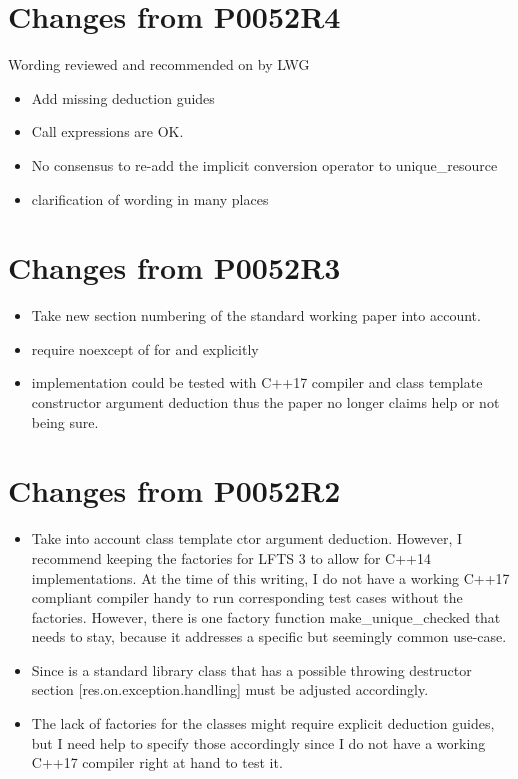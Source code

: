 \documentclass[ebook,11pt,article]{memoir}
\begin{document}
\section{Changes from P0052R4}
Wording reviewed and recommended on by LWG
\begin{itemize}
\item Add missing deduction guides
\item Call expressions are OK.
\item No consensus to re-add the implicit conversion operator to unique_resource
\item clarification of wording in many places
\end{itemize}

\section{Changes from P0052R3}
\begin{itemize}
\item Take new section numbering of the standard working paper into account.
\item require noexcept of  for  and  explicitly
\item implementation could be tested with C++17 compiler and class template constructor argument deduction thus the paper no longer claims help or not being sure.
\end{itemize}


\section{Changes from P0052R2}
\begin{itemize}
\item Take into account class template ctor argument deduction. However, I recommend keeping the factories for LFTS 3 to allow for C++14 implementations. At the time of this writing, I do not have a working C++17 compliant compiler handy to run corresponding test cases without the factories. However, there is one factory function make_unique_checked that needs to stay, because it addresses a specific but seemingly common use-case.
\item Since  is a standard library class that has a possible throwing destructor section [res.on.exception.handling] must be adjusted accordingly.
\item The lack of factories for the classes might require explicit deduction guides, but I need help to specify those accordingly since I do not have a working C++17 compiler right at hand to test it.
\end{itemize}
\end{document}
